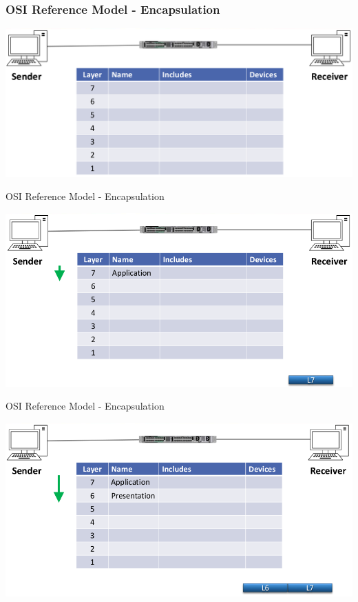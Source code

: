 \documentclass[pdflatex,compress,mathserif]{beamer}
\begin{document}
\begin{frame}
	\frametitle{OSI Reference Model - Encapsulation}
	\begin{center}
		\includegraphics[width=\linewidth]{img/img01}
	\end{center}
\end{frame}

\begin{frame}{OSI Reference Model - Encapsulation}
	\begin{center}
		\includegraphics[width=\linewidth]{img/img02}
	\end{center}
\end{frame}

\begin{frame}{OSI Reference Model - Encapsulation}
	\begin{center}
		\includegraphics[width=\linewidth]{img/img03}
	\end{center}
\end{frame}
\end{document}
